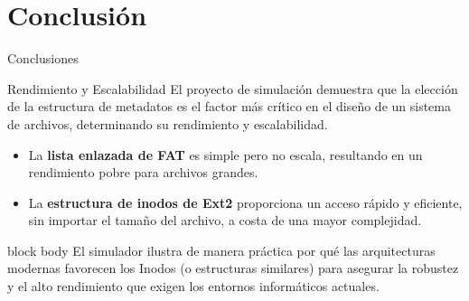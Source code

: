 \documentclass{beamer}
\begin{document}
\section{Conclusión}

\begin{frame}{Conclusiones}
    \begin{alertblock}{Rendimiento y Escalabilidad}
    El proyecto de simulación demuestra que la elección de la estructura de metadatos es el factor más crítico en el diseño de un sistema de archivos, determinando su rendimiento y escalabilidad.
    \end{alertblock}

    \begin{itemize}
        \item La \textbf{lista enlazada de FAT} es simple pero no escala, resultando en un rendimiento pobre para archivos grandes.
        \vspace{0.5cm}
        \item La \textbf{estructura de inodos de Ext2} proporciona un acceso rápido y eficiente, sin importar el tamaño del archivo, a costa de una mayor complejidad.
    \end{itemize}

    \begin{beamercolorbox}[rounded=true,shadow=true,sep=12pt]{block body}
    El simulador ilustra de manera práctica por qué las arquitecturas modernas favorecen los Inodos (o estructuras similares) para asegurar la robustez y el alto rendimiento que exigen los entornos informáticos actuales.
    \end{beamercolorbox}
\end{frame}


\end{document}
